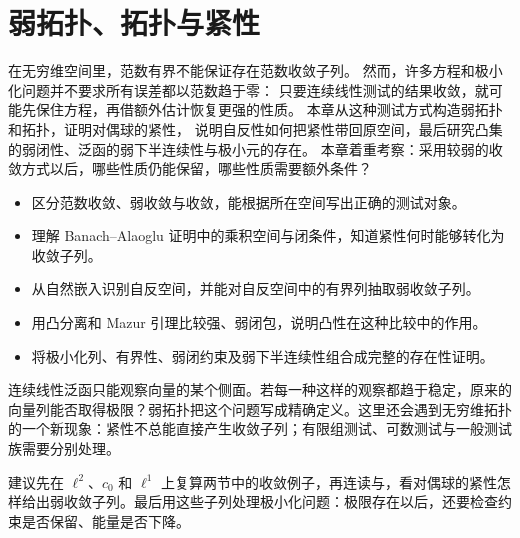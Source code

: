 \chapter{弱拓扑、\WeakStar{}拓扑与紧性}
\label{b1:ch:09}
\begin{chapterabstract}
在无穷维空间里，范数有界不能保证存在范数收敛子列。
然而，许多方程和极小化问题并不要求所有误差都以范数趋于零：
只要连续线性测试的结果收敛，就可能先保住方程，再借额外估计恢复更强的性质。
本章从这种测试方式构造弱拓扑和\WeakStar{}拓扑，证明对偶球的紧性，
说明自反性如何把紧性带回原空间，最后研究凸集的弱闭性、泛函的弱下半连续性与极小元的存在。
本章着重考察：采用较弱的收敛方式以后，哪些性质仍能保留，哪些性质需要额外条件？
\end{chapterabstract}

\begin{learninggoals}
\begin{itemize}
\item\label{b1:item:09-goal-testing}区分范数收敛、弱收敛与\WeakStar{}收敛，能根据所在空间写出正确的测试对象。
\item\label{b1:item:09-goal-compact}理解 Banach--Alaoglu 证明中的乘积空间与闭条件，知道紧性何时能够转化为收敛子列。
\item\label{b1:item:09-goal-reflexive}从自然嵌入识别自反空间，并能对自反空间中的有界列抽取弱收敛子列。
\item\label{b1:item:09-goal-convex}用凸分离和 Mazur 引理比较强、弱闭包，说明凸性在这种比较中的作用。
\item\label{b1:item:09-goal-minimum}将极小化列、有界性、弱闭约束及弱下半连续性组合成完整的存在性证明。
\end{itemize}
\end{learninggoals}

连续线性泛函只能观察向量的某个侧面。若每一种这样的观察都趋于稳定，原来的向量列能否取得极限？弱拓扑把这个问题写成精确定义。这里还会遇到无穷维拓扑的一个新现象：紧性不总能直接产生收敛子列；有限组测试、可数测试与一般测试族需要分别处理。

\ProseParagraphBreak

建议先在 \(\ell^2\)、\(c_0\) 和 \(\ell^1\) 上复算两节中的收敛例子，再连读与，看对偶球的紧性怎样给出弱收敛子列。最后用这些子列处理极小化问题：极限存在以后，还要检查约束是否保留、能量是否下降。


